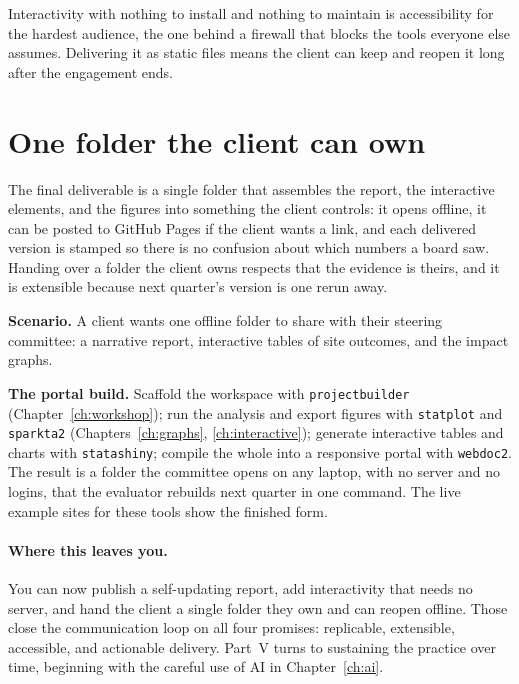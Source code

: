 \documentclass[
    a4paper,
    fontsize=10pt,
    twoside=true,
    numbers=noenddot,
]{kaobook}
\newcounter{appliedexample}
\newenvironment{appliedexample}[1][]{%
    \refstepcounter{appliedexample}%
    \begin{appliedexamplebox}[frametitle={Applied Example~\theappliedexample.~~#1}]%
}{%
    \end{appliedexamplebox}%
}
\begin{document}
Interactivity with nothing to install and nothing to maintain is accessibility for the hardest audience, the one behind a firewall that blocks the tools everyone else assumes. Delivering it as static files means the client can keep and reopen it long after the engagement ends.

\section{One folder the client can own}
The final deliverable is a single folder that assembles the report, the interactive elements, and the figures into something the client controls: it opens offline, it can be posted to GitHub Pages if the client wants a link, and each delivered version is stamped so there is no confusion about which numbers a board saw. Handing over a folder the client owns respects that the evidence is theirs, and it is extensible because next quarter's version is one rerun away.

\begin{appliedexample}[From do-file to shareable project portal]
\textbf{Scenario.} A client wants one offline folder to share with their steering committee: a narrative report, interactive tables of site outcomes, and the impact graphs.

\medskip
\textbf{The portal build.} Scaffold the workspace with \texttt{projectbuilder} (Chapter~\ref{ch:workshop}); run the analysis and export figures with \texttt{statplot} and \texttt{sparkta2} (Chapters~\ref{ch:graphs}, \ref{ch:interactive}); generate interactive tables and charts with \texttt{statashiny}; compile the whole into a responsive portal with \texttt{webdoc2}. The result is a folder the committee opens on any laptop, with no server and no logins, that the evaluator rebuilds next quarter in one command. The live example sites for these tools show the finished form.
\end{appliedexample}

\paragraph{Where this leaves you.} You can now publish a self-updating report, add interactivity that needs no server, and hand the client a single folder they own and can reopen offline. Those close the communication loop on all four promises: replicable, extensible, accessible, and actionable delivery. Part~V turns to sustaining the practice over time, beginning with the careful use of AI in Chapter~\ref{ch:ai}.
\end{document}

